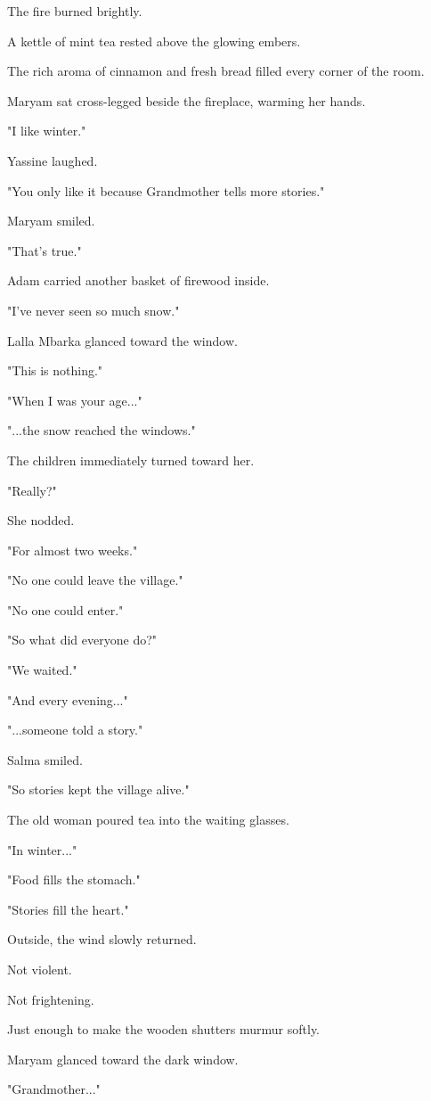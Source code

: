 \documentclass[12pt,openany]{book}
\begin{document}
The fire burned brightly.

A kettle of mint tea rested above the glowing embers.

The rich aroma of cinnamon and fresh bread filled every corner of the room.

Maryam sat cross-legged beside the fireplace, warming her hands.

"I like winter."

Yassine laughed.

"You only like it because Grandmother tells more stories."

Maryam smiled.

"That's true."

Adam carried another basket of firewood inside.

"I've never seen so much snow."

Lalla Mbarka glanced toward the window.

"This is nothing."

"When I was your age..."

"...the snow reached the windows."

The children immediately turned toward her.

"Really?"

She nodded.

"For almost two weeks."

"No one could leave the village."

"No one could enter."

"So what did everyone do?"

"We waited."

"And every evening..."

"...someone told a story."

Salma smiled.

"So stories kept the village alive."

The old woman poured tea into the waiting glasses.

"In winter..."

"Food fills the stomach."

"Stories fill the heart."

Outside, the wind slowly returned.

Not violent.

Not frightening.

Just enough to make the wooden shutters murmur softly.

Maryam glanced toward the dark window.

"Grandmother..."
\end{document}
